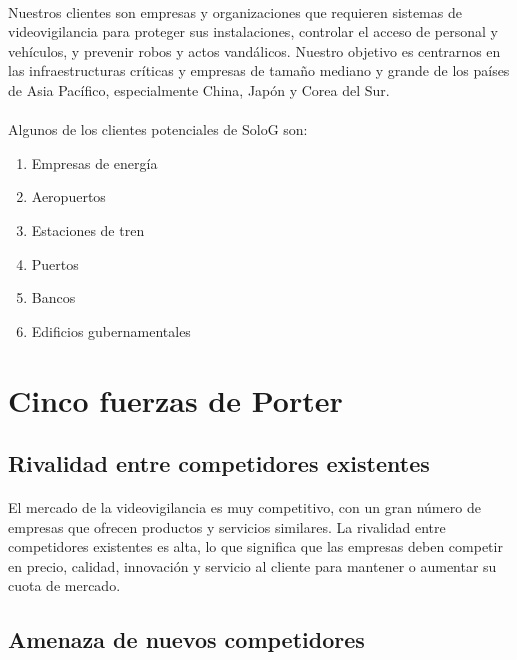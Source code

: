 \documentclass{report}
\begin{document}
        \paragraph*{}{
          Nuestros clientes son empresas y organizaciones que requieren sistemas de videovigilancia para proteger sus instalaciones, controlar el acceso de personal y vehículos, y prevenir robos y actos vandálicos.
          Nuestro objetivo es centrarnos en las infraestructuras críticas y empresas de tamaño mediano y grande de los países de Asia Pacífico, especialmente China, Japón y Corea del Sur.
        }
        \paragraph*{}
        {
          Algunos de los clientes potenciales de SoloG son:
        }
        \begin{multicols}{2}
          \begin{enumerate}
            \item Empresas de energía
            \item Aeropuertos
            \item Estaciones de tren
            \item Puertos
            \item Bancos
            \item Edificios gubernamentales
          \end{enumerate}
        \end{multicols}
      \clearpage\section{Cinco fuerzas de Porter}
        \subsection*{Rivalidad entre competidores existentes}
          \paragraph*{}{El mercado de la videovigilancia es muy competitivo, con un gran número de empresas que ofrecen productos y servicios similares. La rivalidad entre competidores existentes es alta, lo que significa que las empresas deben competir en precio, calidad, innovación y servicio al cliente para mantener o aumentar su cuota de mercado.}
        \subsection*{Amenaza de nuevos competidores}
\end{document}

